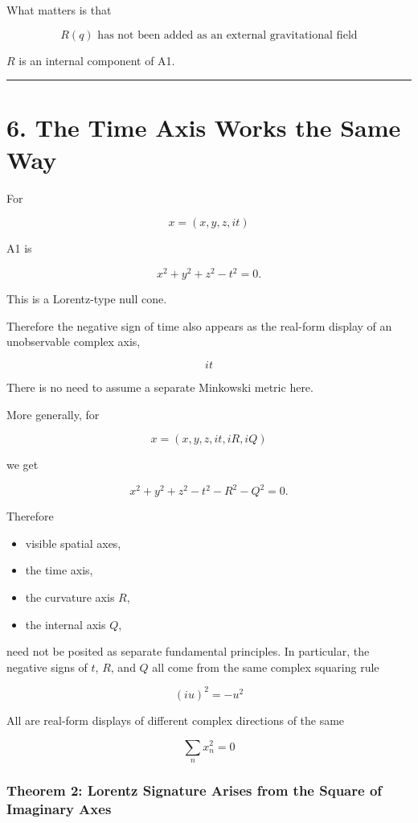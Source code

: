 \documentclass[
  a4paper,
]{article}
\providecommand{\tightlist}{%
  \setlength{\itemsep}{0pt}\setlength{\parskip}{0pt}}
\begin{document}
What matters is that

\[
\boxed{
R(q)\text{ has not been added as an external gravitational field}
}
\]

\(R\) is an internal component of A1.

\begin{center}\rule{0.5\linewidth}{0.5pt}\end{center}

\section{6. The Time Axis Works the Same
Way}\label{the-time-axis-works-the-same-way}

For

\[
x=(x,y,z,it)
\]

A1 is

\[
x^2+y^2+z^2-t^2=0.
\]

This is a Lorentz-type null cone.

Therefore the negative sign of time also appears as the real-form
display of an unobservable complex axis,

\[
\boxed{it}
\]

There is no need to assume a separate Minkowski metric here.

More generally, for

\[
x=(x,y,z,it,iR,iQ)
\]

we get

\[
\boxed{
x^2+y^2+z^2-t^2-R^2-Q^2=0
}.
\]

Therefore

\begin{itemize}
\tightlist
\item
  visible spatial axes,
\item
  the time axis,
\item
  the curvature axis \(R\),
\item
  the internal axis \(Q\),
\end{itemize}

need not be posited as separate fundamental principles. In particular,
the negative signs of \(t\), \(R\), and \(Q\) all come from the same
complex squaring rule

\[
\boxed{(iu)^2=-u^2}
\]

All are real-form displays of different complex directions of the same

\[
\boxed{
\sum_nx_n^2=0
}
\]

\subsubsection{Theorem 2: Lorentz Signature Arises from the Square of
Imaginary
Axes}\label{theorem-2-lorentz-signature-arises-from-the-square-of-imaginary-axes}
\end{document}
